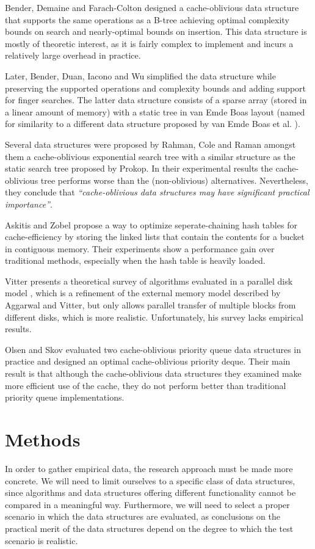 \documentclass{acm_proc_article-sp}
\begin{document}
Bender, Demaine and Farach-Colton designed a cache-oblivious data structure that supports the same operations as a B-tree \cite{bender2005cob} achieving optimal complexity bounds on search and nearly-optimal bounds on insertion. This data structure is mostly of theoretic interest, as it is fairly complex to implement and incurs a relatively large overhead in practice.

Later, Bender, Duan, Iacono and Wu simplified the data structure \cite{bender2004lpc} while preserving the supported operations and complexity bounds and adding support for finger searches. The latter data structure consists of a sparse array (stored in a linear amount of memory) with a static tree in van Emde Boas layout (named for similarity to a different data structure proposed by van Emde Boas et al. \cite{vanemdeboas1976dai}).

Several data structures were proposed by Rahman, Cole and Raman \cite{rahman2001opd} amongst them a cache-oblivious exponential search tree with a similar structure as the static search tree proposed by Prokop. In their experimental results the cache-oblivious tree performs worse than the (non-oblivious) alternatives. Nevertheless, they conclude that \textit{``cache-obli\-vious data structures may have significant practical importance''}.

Askitis and Zobel \cite{askitis2005ccc} propose a way to optimize seperate-chaining hash tables for cache-efficiency by storing the linked lists that contain the contents for a bucket in contiguous memory. Their experiments show a performance gain over traditional methods, especially when the hash table is heavily loaded.

Vitter presents a theoretical survey of algorithms evaluated in a parallel disk model \cite{vitter2001ema}, which is a refinement of the external memory model described by Aggarwal and Vitter, but only allows parallel transfer of multiple blocks from different disks, which is more realistic. Unfortunately, his survey lacks empirical results.

Olsen and Skov evaluated two cache-oblivious priority queue data structures in practice \cite{olsen2002coa} and designed an optimal cache-obli\-vious priority deque. Their main result is that although the cache-obli\-vious data structures they examined make more efficient use of the cache, they do not perform better than traditional priority queue implementations.

\section{Methods}
In order to gather empirical data, the research approach must be made more concrete. We will need to limit ourselves to a specific class of data structures, since algorithms and data structures offering different functionality cannot be compared in a meaningful way. Furthermore, we will need to select a proper scenario in which the data structures are evaluated, as conclusions on the practical merit of the data structures depend on the degree to which the test scenario is realistic.
\end{document}
